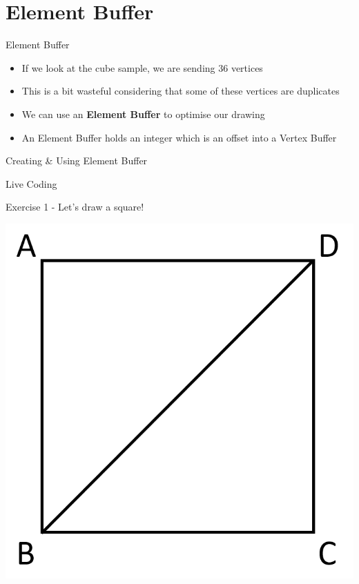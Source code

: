 \part{Element Buffer}
\frame{\partpage}

\begin{frame}{Element Buffer}
	\begin{itemize}
		\pause\item If we look at the cube sample, we are sending 36 vertices
		\pause\item This is a bit wasteful considering that some of these vertices are duplicates
		\pause\item We can use an \textbf{Element Buffer} to optimise our drawing
		\pause\item An Element Buffer holds an integer which is an offset into a Vertex Buffer
	\end{itemize}
\end{frame}

\begin{frame}{Creating \& Using Element Buffer}
	\begin{center}
		Live Coding
	\end{center}
\end{frame}

\begin{frame}{Exercise 1 - Let's draw a square!}
\begin{center}
	\includegraphics[height=0.8\textheight]{square_vertices}
\end{center}
\end{frame}

